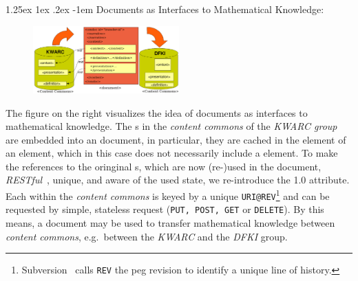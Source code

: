 \documentclass[pdftex,bibtotocnumbered,idxtotoc,11pt]{scrartcl}
\makeatletter
\renewcommand\paragraph{\@startsection{paragraph}{4}{\z@}%
{1.25ex \@plus1ex \@minus.2ex}%
{-1em}%
{\setlength{\parfillskip}{\z@ \@plus 1fil}%
\raggedsection\normalfont\sectfont\nobreak
\size@paragraph\nobreak}}
\makeatother
\begin{document}
\paragraph{Documents as Interfaces to Mathematical Knowledge:} 
\begin{figure}\vspace*{-.5em}
\includegraphics[width=0.5\textwidth]{img/interfaces.png}\vspace*{-1.5em}
\end{figure} 
The figure on the right visualizes the idea of documents as interfaces to mathematical
knowledge. The {\infom}s in the {\emph{content commons}} of the {\emph{KWARC group}} are
embedded into an {\omdoc} document, in particular, they are cached in the
{} element of an {} element, which in this case does not
necessarily include a {} element. To make the references to the
oringinal {\infom}s, which are now (re-)used in the document,
{\emph{RESTful}}~\cite{wiki:rst}, unique, and aware of the used {\infom} state, we
re-introduce the {\omdoc}1.0 {} attribute. Each {\infom} within the
{\emph{content commons}} is keyed by a unique
{\tt{URI@REV}}\footnote{Subversion~\cite{SVN:web} calls {\tt{REV}} the peg revision to
  identify a unique line of history.} and can be requested by simple, stateless
{} request ({\tt{PUT, POST, GET}} or {\tt{DELETE}}).  By this means, a document
may be used to transfer mathematical knowledge between {\emph{content commons}}, e.g.\
between the {\emph{KWARC}} and the {\emph{DFKI}} group.

\end{document}
